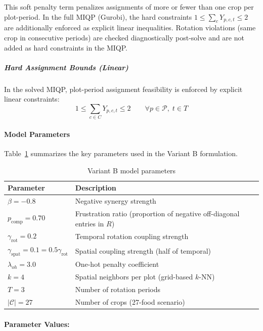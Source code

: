 \documentclass{oqireport}
\begin{document}
This soft penalty term penalizes assignments of more or fewer than one crop per plot-period. In the full MIQP (Gurobi), the hard constraints $1 \le \sum_{c} Y_{p,c,t} \le 2$ are additionally enforced as explicit linear inequalities. Rotation violations (same crop in consecutive periods) are checked diagnostically post-solve and are not added as hard constraints in the MIQP.

\subparagraph{Hard Assignment Bounds (Linear)}
In the solved MIQP, plot-period assignment feasibility is enforced by explicit linear constraints:
\begin{equation}
1 \le \sum_{c \in C} Y_{p,c,t} \le 2 \qquad \forall p \in \mathcal{P},\; t \in T
\end{equation}


\paragraph{Model Parameters}

Table~\ref{tab:variant_b_params} summarizes the key parameters used in the Variant B formulation.

\begin{table}[H]
\centering
\caption{Variant B model parameters}
\label{tab:variant_b_params}
\begin{tabular}{@{}lp{8cm}@{}}
\toprule
\textbf{Parameter} & \textbf{Description} \\
\midrule
$\beta = -0.8$ & Negative synergy strength \\
$p_{\text{comp}} = 0.70$ & Frustration ratio (proportion of negative off-diagonal entries in $R$) \\
$\gamma_{\text{rot}} = 0.2$ & Temporal rotation coupling strength \\
$\gamma_{\text{spat}} = 0.1 = 0.5\gamma_{\text{rot}}$ & Spatial coupling strength (half of temporal) \\
$\lambda_{oh} = 3.0$ & One-hot penalty coefficient \\
$k = 4$ & Spatial neighbors per plot (grid-based $k$-NN) \\
$T = 3$ & Number of rotation periods \\
$|\mathcal{C}| = 27$ & Number of crops (27-food scenario) \\
\bottomrule
\end{tabular}
\end{table}

\paragraph{Parameter Values:}
\end{document}
